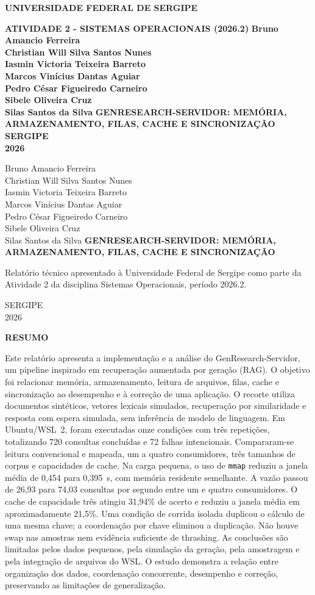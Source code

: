 \documentclass[12pt,a4paper]{article}
\newcommand{\titulotrabalho}{GENRESEARCH-SERVIDOR: MEMÓRIA, ARMAZENAMENTO, FILAS, CACHE E SINCRONIZAÇÃO}
\newcommand{\integrantes}{Bruno Amancio Ferreira\\Christian Will Silva Santos Nunes\\Iasmin Victoria Teixeira Barreto\\Marcos Vinícius Dantas Aguiar\\Pedro César Figueiredo Carneiro\\Sibele Oliveira Cruz\\Silas Santos da Silva}
\begin{document}
  \hypersetup{pageanchor=false}
  \begin{titlepage}
  \thispagestyle{empty}
  \begin{center}
  \textbf{UNIVERSIDADE FEDERAL DE SERGIPE}
  \vspace{1.2cm}

  \textbf{ATIVIDADE 2 - SISTEMAS OPERACIONAIS (2026.2)}
  \vfill
  {\bfseries\integrantes}
  \vfill
  {\large\textbf{\titulotrabalho}}
  \vfill
  \textbf{SERGIPE}\\\textbf{2026}
  \end{center}
  \end{titlepage}

  \begin{titlepage}
  \thispagestyle{empty}
  \begin{center}
  \integrantes
  \vfill
  {\large\textbf{\titulotrabalho}}
  \vfill
  \begin{flushright}
  \begin{minipage}{0.55\textwidth}
  Relatório técnico apresentado à Universidade Federal de Sergipe como parte da Atividade 2 da disciplina Sistemas Operacionais, período 2026.2.
  \end{minipage}
  \end{flushright}
  \vfill
  SERGIPE\\2026
  \end{center}
  \end{titlepage}

  \hypersetup{pageanchor=true}
  \thispagestyle{empty}
  \begin{center}\textbf{RESUMO}\end{center}
  Este relatório apresenta a implementação e a análise do GenResearch-Servidor, um pipeline inspirado em recuperação aumentada por geração (RAG). O objetivo foi relacionar memória, armazenamento, leitura de arquivos, filas, cache e sincronização ao desempenho e à correção de uma aplicação. O recorte utiliza documentos sintéticos, vetores lexicais simulados, recuperação por similaridade e resposta com espera simulada, sem inferência de modelo de linguagem. Em Ubuntu/WSL~2, foram executadas onze condições com três repetições, totalizando 720 consultas concluídas e 72 falhas intencionais. Compararam-se leitura convencional e mapeada, um a quatro consumidores, três tamanhos de corpus e capacidades de cache. Na carga pequena, o uso de \texttt{mmap} reduziu a janela média de 0,454 para 0,395~s, com memória residente semelhante. A vazão passou de 26,93 para 74,03 consultas por segundo entre um e quatro consumidores. O cache de capacidade três atingiu 31,94\% de acerto e reduziu a janela média em aproximadamente 21,5\%. Uma condição de corrida isolada duplicou o cálculo de uma mesma chave; a coordenação por chave eliminou a duplicação. Não houve swap nas amostras nem evidência suficiente de thrashing. As conclusões são limitadas pelos dados pequenos, pela simulação da geração, pela amostragem e pela integração de arquivos do WSL. O estudo demonstra a relação entre organização dos dados, coordenação concorrente, desempenho e correção, preservando as limitações de generalização.
\end{document}
